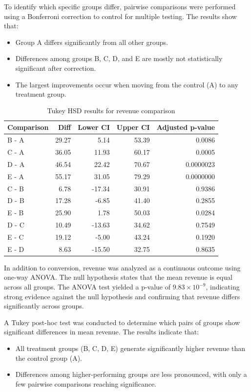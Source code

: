\documentclass[10pt,a4paper]{article}
\begin{document}
To identify which specific groups differ, pairwise comparisons were performed using a Bonferroni correction to control for multiple testing. The results show that:
\begin{itemize}
\item Group A differs significantly from all other groups.
\item Differences among groups B, C, D, and E are mostly not statistically significant after correction.
\item The largest improvements occur when moving from the control (A) to any treatment group.
\end{itemize}

\begin{table}[H]
\centering
\begin{tabular}{lrrrr}
\hline
Comparison & Diff & Lower CI & Upper CI & Adjusted p-value \\
\hline
B - A & 29.27 & 5.14 & 53.39 & 0.0086 \\
C - A & 36.05 & 11.93 & 60.17 & 0.0005 \\
D - A & 46.54 & 22.42 & 70.67 & 0.0000023 \\
E - A & 55.17 & 31.05 & 79.29 & 0.0000000 \\
C - B & 6.78 & -17.34 & 30.91 & 0.9386 \\
D - B & 17.28 & -6.85 & 41.40 & 0.2855 \\
E - B & 25.90 & 1.78 & 50.03 & 0.0284 \\
D - C & 10.49 & -13.63 & 34.62 & 0.7549 \\
E - C & 19.12 & -5.00 & 43.24 & 0.1920 \\
E - D & 8.63 & -15.50 & 32.75 & 0.8635 \\
\hline
\end{tabular}
\caption{Tukey HSD results for revenue comparison}
\end{table}

In addition to conversion, revenue was analyzed as a continuous outcome using one-way ANOVA. The null hypothesis states that the mean revenue is equal across all groups. The ANOVA test yielded a p-value of $9.83 \times 10^{-9}$, indicating strong evidence against the null hypothesis and confirming that revenue differs significantly across groups.

A Tukey post-hoc test was conducted to determine which pairs of groups show significant differences in mean revenue. The results indicate that:
\begin{itemize}
\item All treatment groups (B, C, D, E) generate significantly higher revenue than the control group (A).
\item Differences among higher-performing groups are less pronounced, with only a few pairwise comparisons reaching significance.
\end{itemize}
\end{document}
